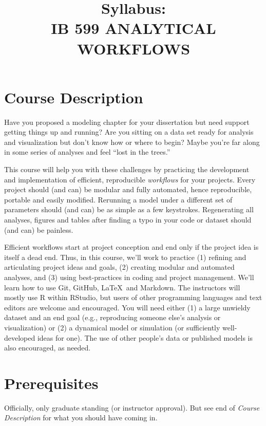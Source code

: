 \documentclass[10pt]{article}
\title{Syllabus:\\IB 599 ANALYTICAL WORKFLOWS}
\author{}
\date{}
\begin{document}
\maketitle
\vspace{-50pt}


\section*{Course Description}
	Have you proposed a modeling chapter for your dissertation but need support getting things up and 
	running?  
	Are you sitting on a data set ready for analysis and visualization but don't know how or 
	where to begin?  
	Maybe you're far along in some series of analyses and feel ``lost in the trees.''
	
	This course will help you with these challenges by practicing the development and implementation of 
	efficient, reproducible \emph{workflows} for your projects.  
	Every project should (and can) be modular and fully automated, hence reproducible, portable and 
	easily modified.  
	Rerunning a model under a different set of parameters should (and can) be as simple as a few 
	keystrokes. 
	Regenerating all analyses, figures and tables after finding a typo in your code or dataset should (and 
	can) be painless.
	
	Efficient workflows start at project conception and end only if the project idea is itself a dead end.  
	Thus, in this course, we'll work to practice 
	(1) refining and articulating project ideas and goals, 
	(2) creating modular and automated analyses, and 
	(3) using best-practices in coding and project management. 
	We'll learn how to use Git, GitHub, \LaTeX\, and Markdown.  
	The instructors will mostly use \textsf{R} within RStudio, but users of other programming languages 
	and text editors are welcome and encouraged.  
	You will need either 
	(1) a large unwieldy dataset and an end goal (e.g., reproducing someone else's analysis or 
	visualization) or 
	(2) a dynamical model or simulation (or sufficiently well-developed ideas for one).  
	The use of other people's data or published models is also encouraged, as needed.
	
\section*{Prerequisites}
\noindent
	Officially, only graduate standing (or  instructor approval).
	But see  end of \emph{Course Description} for what you should have coming in.
	
\end{document}
